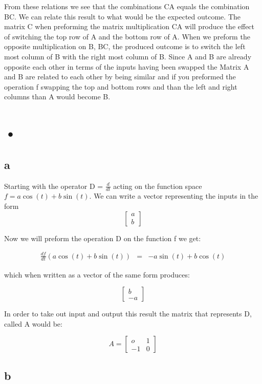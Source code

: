 \documentclass[12pt]{article}
\begin{document}
From these relations we see that the combinations CA equals the combination BC. We can relate this result to what would be the expected outcome. The matrix C when preforming the matrix multiplication CA will produce the effect of switching the top row of A and the bottom row of A. When we preform the opposite multiplication on B, BC, the produced outcome is to switch the left most column of B with the right most column of B. Since A and B are already opposite each other in terms of the inputs having been swapped the Matrix A and B are related to each other by being similar and if you preformed the operation f swapping the top and bottom rows and than the left and right columns than A would become B.

\section{•}

\subsection*{a}

Starting with the operator D = $\frac{d}{dt}$ acting on the function space $f = a \cos (t) + b \sin (t)$. We can write a vector representing the inputs in the form
\[
\begin{bmatrix}
a\\
b
\end{bmatrix}
\]

Now we will preform the operation D on the function f we get:

\begin{eqnarray*}
\frac{df}{dt}( a \cos (t) + b \sin (t)) &=& -a \sin (t) + b \cos (t)
\end{eqnarray*}

which when written as a vector of the same form produces:

\[
\begin{bmatrix}
b\\
-a
\end{bmatrix}
\]

In order to take out input and output this result the matrix that represents D, called A would be:

\[
A =
\begin{bmatrix}
o & 1\\
-1 & 0
\end{bmatrix}
\]

\subsection*{b}
\end{document}

